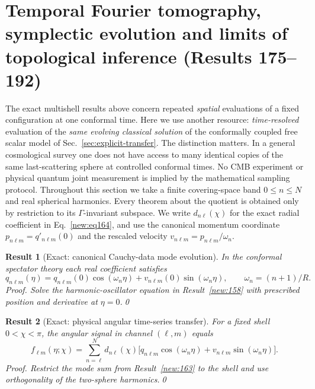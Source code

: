\documentclass[aps,prd,onecolumn,notitlepage,groupedaddress,11pt]{revtex4-2}
\newtheorem{result}{Result}
\begin{document}
\section{Temporal Fourier tomography, symplectic evolution and limits of topological inference (Results 175--192)}\label{sec:temporal-tomography}
The exact multishell results above concern repeated \emph{spatial} evaluations of a fixed configuration at one conformal time. Here we use another resource: \emph{time-resolved} evaluation of the \emph{same evolving classical solution} of the conformally coupled free scalar model of Sec.~\ref{sec:explicit-transfer}. The distinction matters. In a general cosmological survey one does not have access to many identical copies of the same last-scattering sphere at controlled conformal times. No CMB experiment or physical quantum joint measurement is implied by the mathematical sampling protocol. Throughout this section we take a finite covering-space band $0\le n\le N$ and real spherical harmonics. Every theorem about the quotient is obtained only by restriction to its $\Gamma$-invariant subspace. We write $d_{n\ell}(\chi)$ for the exact radial coefficient in Eq.~\eqref{new:eq164}, and use the canonical momentum coordinate $p_{n\ell m}=q'_{n\ell m}(0)$ and the rescaled velocity $v_{n\ell m}=p_{n\ell m}/\omega_n$.

\begin{result}[\textsf{Exact}: canonical Cauchy-data mode evolution]\label{new:175}
In the conformal spectator theory each real coefficient satisfies
\begin{equation}\label{new:eq175}
 q_{n\ell m}(\eta)=q_{n\ell m}(0)\cos(\omega_n\eta)+v_{n\ell m}(0)\sin(\omega_n\eta),\qquad \omega_n=(n+1)/R.
\end{equation}
\textit{Proof.} Solve the harmonic-oscillator equation in Result~\ref{new:158} with prescribed position and derivative at $\eta=0$.\qed
\end{result}

\begin{result}[\textsf{Exact}: physical angular time-series transfer]\label{new:176}
For a fixed shell $0<\chi<\pi$, the angular signal in channel $(\ell,m)$ equals
\begin{equation}\label{new:eq176}
 f_{\ell m}(\eta;\chi)=\sum_{n=\ell}^{N}d_{n\ell}(\chi)\bigl[q_{n\ell m}\cos(\omega_n\eta)+v_{n\ell m}\sin(\omega_n\eta)\bigr].
\end{equation}
\textit{Proof.} Restrict the mode sum from Result~\ref{new:163} to the shell and use orthogonality of the two-sphere harmonics.\qed
\end{result}
\end{document}
